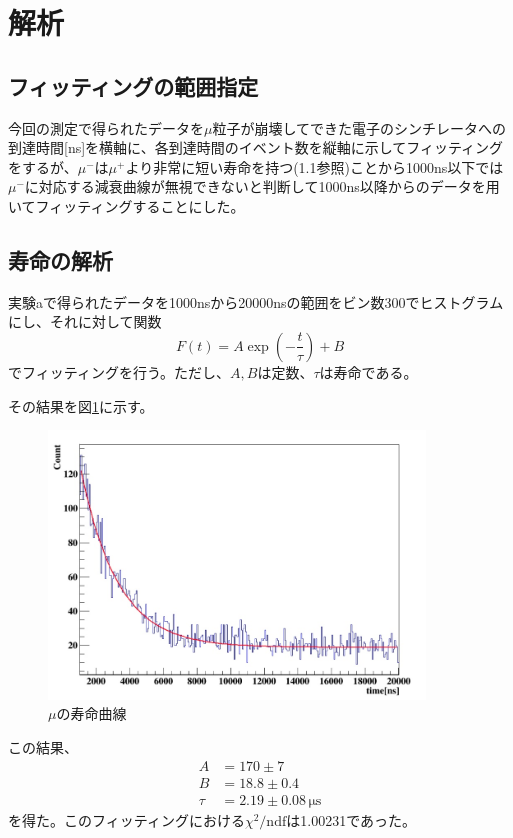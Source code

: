 \section{解析}
\subsection{フィッティングの範囲指定}
今回の測定で得られたデータを$\mu$粒子が崩壊してできた電子のシンチレータへの到達時間[ns]を‎横軸に、各到達時間のイベント数を縦軸に示してフィッティングをするが、$\mu^-$は$\mu^+$より非常に短い寿命を持つ(1.1参照)ことから1000ns以下では$\mu^-$に対応する減衰曲線が無視できないと判断して1000ns以降からのデータを用いてフィッティングすることにした。

\subsection{寿命の解析}
実験aで得られたデータを1000nsから20000nsの範囲をビン数300でヒストグラムにし、それに対して関数
\begin{equation}
F(t)=A\exp\left(-\frac{t}{\tau}\right)+B
\end{equation}
でフィッティングを行う。ただし、$A,B$は定数、$\tau$は寿命である。

その結果を図\ref{mu_lifetime}に示す。
\begin{figure}[htbp]
  \centering
  \includegraphics[width=10cm,bb=0 0 919 656]{lifetime.jpg}
  \caption{$\mu$の寿命曲線}
  \label{mu_lifetime}
\end{figure}

この結果、
\begin{align*}
A &= 170 \pm 7  \\
B &= 18.8 \pm 0.4 \\
\tau &= 2.19 \pm 0.08\,\mathrm{\mu s}
\end{align*}
を得た。このフィッティングにおける$\chi^2/\mathrm{ndf}$は1.00231であった。

